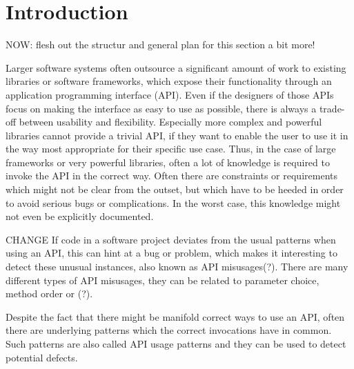 \chapter{Introduction}\label{chapter:introduction}

NOW: flesh out the structur and general plan for this section a bit more!

Larger software systems often outsource a significant amount of work to existing libraries or software frameworks, which expose their functionality through an application programming interface (API).
Even if the designers of those APIs focus on making the interface as easy to use as possible, there is always a trade-off between usability and flexibility.
Especially more complex and powerful libraries cannot provide a trivial API, if they want to enable the user to use it in the way most appropriate for their specific use case.
Thus, in the case of large frameworks or very powerful libraries, often a lot of knowledge is required to invoke the API in the correct way.
Often there are constraints or requirements which might not be clear from the outset, but which have to be heeded in order to avoid serious bugs or complications.
In the worst case, this knowledge might not even be explicitly documented.

CHANGE
If code in a software project deviates from the usual patterns when using an API, this can hint at a bug or problem, which makes it interesting to detect these unusual instances, also known as API misusages(?).
There are many different types of API misusages, they can be related to parameter choice, method order or (?).

Despite the fact that there might be manifold correct ways to use an API, often there are underlying patterns which the correct invocations have in common.
Such patterns are also called API usage patterns \cite{robillard2013automated} and they can be used to detect potential defects.



